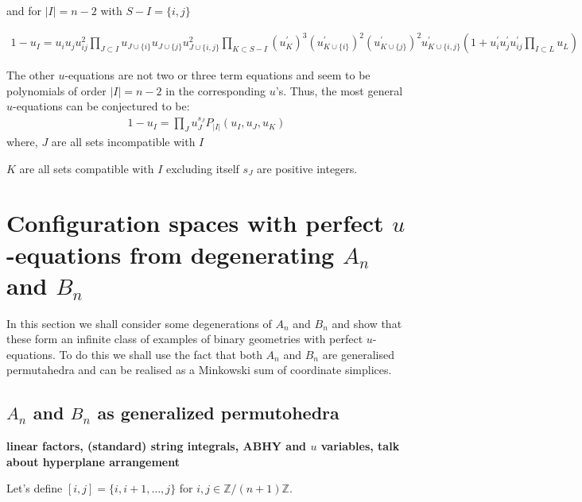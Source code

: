 \documentclass[hidelinks,12pt]{article}
\newcommand{\bea}[1]{\begin{eqnarray}\label{#1} }
\newcommand{\eea}{\end{eqnarray}}
\def\bea{\begin{eqnarray}}
\def\eea{\end{eqnarray}}
\begin{document}
\begin{enumerate}
and for $|I| =n-2$ with $S- I = \{i, j\}$

\bea
1-u_{I}= u_i u_j u^{2}_{ij} \prod_{J \subset I} u_{J \cup \{i\}} u_{J \cup \{j\}} u^{2}_{J \cup \{i,j\}} \prod_{K \subset S-I} (u^{'}_K)^{3} (u^{'}_{K \cup \{i\}})^{2}  (u^{'}_{K \cup\{j\}})^{2}  u^{'}_{K\cup \{i,j\}} \left( 1+ u^{'}_i u^{'}_j u^{'}_{ij} \prod_{I \subset L} u_L \right)                       \nonumber
\eea
   
The other $u$-equations are not two or three term equations and seem to be polynomials of order $|I|=n-2$ in the corresponding $u$'s. Thus, the most general $u$-equations can be conjectured to be:
\bea
1-u_{I} = \prod_{J} u^{s_J}_{J} P_{|I|}(u_I, u_J,u_K) 
\eea
where, $J$ are all sets incompatible with $I$

 $K$ are all sets compatible with $I$ excluding itself 
 $s_J$ are positive integers. 

\end{enumerate}
 
\section{Configuration spaces with perfect $u$-equations from degenerating $A_n$ and $B_n$}
In this section we shall consider some degenerations of $A_n$ and $B_n$ and show that these form an infinite class of examples of binary geometries with perfect $u$-equations. To do this we shall use the fact that both $A_n$ and $B_n$ are generalised permutahedra and can be realised as a Minkowski sum of coordinate simplices. 

\subsection{$A_n$ and $B_n$ as generalized permutohedra} 

{\bf linear factors, (standard) string integrals, ABHY and $u$ variables, talk about hyperplane arrangement}

Let's define $[i,j]=\{i,i+1,\dots,j\}$ for $i,j\in \mathbb Z/(n+1)\mathbb Z$.
\end{document}
